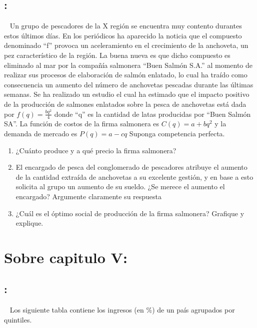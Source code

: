 \documentclass[
  letterpaper,
  DIV=11,
  numbers=noendperiod]{scrreport}
\begin{document}
\hypertarget{section-60}{%
\subsection{:}\label{section-60}}

~ Un grupo de pescadores de la X región se encuentra muy contento
durantes estos últimos días. En los periódicos ha aparecido la noticia
que el compuesto denominado ``f'' provoca un aceleramiento en el
crecimiento de la anchoveta, un pez característico de la región. La
buena nueva es que dicho compuesto es eliminado al mar por la compañía
salmonera ``Buen Salmón S.A.'' al momento de realizar sus procesos de
elaboración de salmón enlatado, lo cual ha traído como consecuencia un
aumento del número de anchovetas pescadas durante las últimas semanas.
Se ha realizado un estudio el cual ha estimado que el impacto positivo
de la producción de salmones enlatados sobre la pesca de anchovetas está
dada por \(f(q) = \frac{bq^2}{4}\) donde ``q'' es la cantidad de latas
producidas por ``Buen Salmón SA''. La función de costos de la firma
salmonera es \(C(q) = a + bq^2\) y la demanda de mercado es
\(P(q) = a - cq\) Suponga competencia perfecta.

\begin{enumerate}
\def\labelenumi{\alph{enumi})}
\item
  ¿Cuánto produce y a qué precio la firma salmonera?
\item
  El encargado de pesca del conglomerado de pescadores atribuye el
  aumento de la cantidad extraída de anchovetas a su excelente gestión,
  y en base a esto solicita al grupo un aumento de su sueldo. ¿Se merece
  el aumento el encargado? Argumente claramente su respuesta
\item
  ¿Cuál es el óptimo social de producción de la firma salmonera?
  Grafique y explique.
\end{enumerate}

\hypertarget{sobre-capitulo-v}{%
\section{Sobre capitulo V:}\label{sobre-capitulo-v}}

\hypertarget{section-61}{%
\subsection{:}\label{section-61}}

~ Los siguiente tabla contiene los ingresos (en \%) de un país agrupados
por quintiles.
\end{document}
